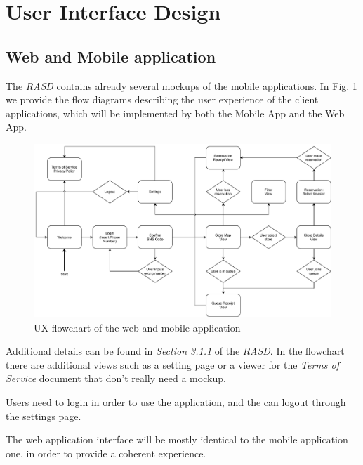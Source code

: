 
\section{User Interface Design}

\subsection{Web and Mobile application}

The \emph{RASD} contains already several mockups of the mobile applications. In Fig. \ref{fig:ux_flowchart} we provide the flow diagrams describing the user experience of the client applications, which will be implemented by both the Mobile App and the Web App.

\begin{figure}[H]
    \centering
    \includegraphics[width=\linewidth]{images/draw.io/ux_diagram.pdf}
    \caption{UX flowchart of the web and mobile application}
    \label{fig:ux_flowchart}
\end{figure}

Additional details can be found in \emph{Section 3.1.1} of the \emph{RASD}.
In the flowchart there are additional views such as a setting page or a viewer for the \emph{Terms of Service} document that don't really need a mockup.

Users need to login in order to use the application, and the can logout through the settings page.

The web application interface will be mostly identical to the mobile application one, in order to provide a coherent experience.

